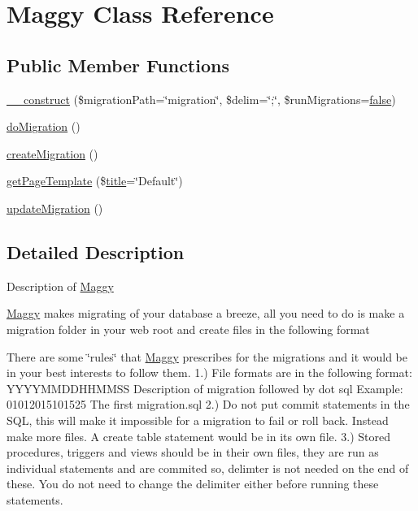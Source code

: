 \hypertarget{classMaggy}{}\section{Maggy Class Reference}
\label{classMaggy}
\subsection*{Public Member Functions}
\begin{DoxyCompactItemize}
\item 
\hyperlink{classMaggy_a067cf2f5b502b1ff73d63e1a2b927545}{\+\_\+\+\_\+construct} (\$migration\+Path=\char`\"{}migration\char`\"{}, \$delim=\char`\"{};\char`\"{}, \$run\+Migrations=\hyperlink{tina4_8php_aec2deb5590a84bee262c3bea206ae88f}{false})
\item 
\hyperlink{classMaggy_a4c8fb8426aeb2aaed4968fbb207d19c2}{do\+Migration} ()
\item 
\hyperlink{classMaggy_a2b4d618fa3afc138f4b1cab39adc371c}{create\+Migration} ()
\item 
\hyperlink{classMaggy_a494c35bf7f6d5a704e430d20da195954}{get\+Page\+Template} (\$\hyperlink{Shape_8php_ad264ad0cabbe965bf7f7c8a5ed6abebb}{title}=\char`\"{}Default\char`\"{})
\item 
\hyperlink{classMaggy_afd787d71f29b356d6a6de0d0707b6be4}{update\+Migration} ()
\end{DoxyCompactItemize}


\subsection{Detailed Description}
Description of \hyperlink{classMaggy}{Maggy}

\hyperlink{classMaggy}{Maggy} makes migrating of your database a breeze, all you need to do is make a migration folder in your web root and create files in the following format

There are some \char`\"{}rules\char`\"{} that \hyperlink{classMaggy}{Maggy} prescribes for the migrations and it would be in your best interests to follow them. 1.) File formats are in the following format\+: Y\+Y\+Y\+Y\+M\+M\+D\+D\+H\+H\+M\+M\+S\+S Description of migration followed by dot sql Example\+: 01012015101525 The first migration.\+sql 2.) Do not put commit statements in the S\+Q\+L, this will make it impossible for a migration to fail or roll back. Instead make more files. A create table statement would be in its own file. 3.) Stored procedures, triggers and views should be in their own files, they are run as individual statements and are commited so, delimter is not needed on the end of these. You do not need to change the delimiter either before running these statements.


